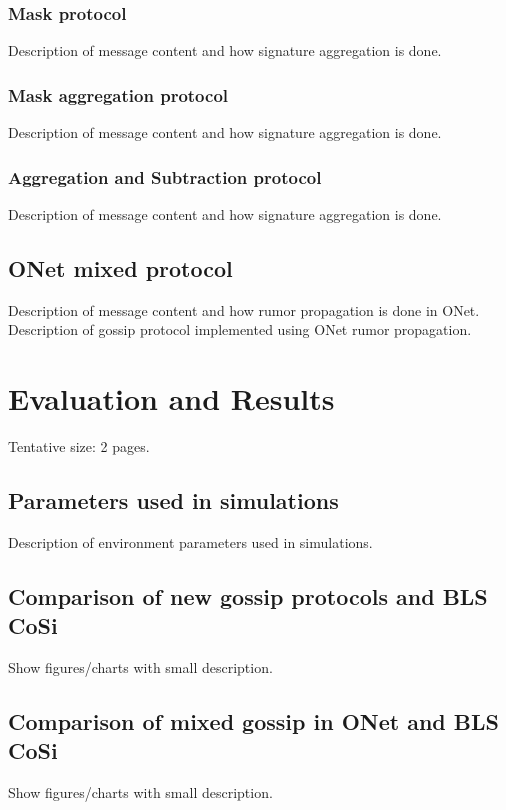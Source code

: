 \documentclass[a4paper,11pt,oneside]{report}
\begin{document}
\subsection{Mask protocol}
Description of message content and how signature aggregation is done. 

\subsection{Mask aggregation protocol}
Description of message content and how signature aggregation is done. 

\subsection{Aggregation and Subtraction protocol}
Description of message content and how signature aggregation is done. 

\section{ONet mixed protocol}
Description of message content and how rumor propagation is done in ONet.
Description of gossip protocol implemented using ONet rumor propagation. 

\chapter{Evaluation and Results}


Tentative size: 2 pages.

\section{Parameters used in simulations}
Description of environment parameters used in simulations.

\section{Comparison of new gossip protocols and BLS CoSi}
Show figures/charts with small description.

\section{Comparison of mixed gossip in ONet and BLS CoSi}
Show figures/charts with small description.
\end{document}
